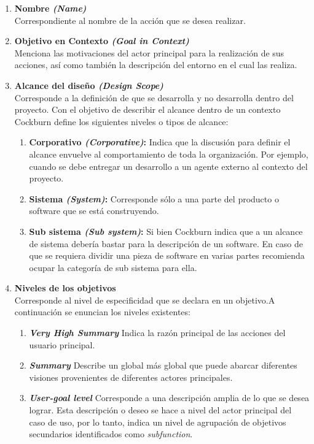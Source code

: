 \begin{enumerate}
  \item \textbf{Nombre \textit{(Name)}}\mbox{}\\ Correspondiente al nombre de la acción que se desea realizar.
  \item \textbf{Objetivo en Contexto \textit{(Goal in Context)}}\mbox{}\\ Menciona las motivaciones del actor principal para la realización de sus acciones, así como también la descripción del entorno en el cual las realiza.
  \item \textbf{Alcance del diseño \textit{(Design Scope)}} \mbox{} \\ Corresponde a la definición de que se desarrolla y no desarrolla dentro del proyecto. Con el objetivo de describir el alcance dentro de un contexto Cockburn define los siguientes niveles o tipos de alcance:
    \begin{enumerate}
      \item \textbf{Corporativo \textit{(Corporative)}:} Indica que la discusión para definir el alcance envuelve al comportamiento de toda la organización. Por ejemplo, cuando se debe entregar un desarrollo a un agente externo al contexto del proyecto.
      \item \textbf{Sistema \textit{(System)}:} Corresponde sólo a una parte del producto o software que se está construyendo.
      \item \textbf{Sub sistema \textit{(Sub system)}:} Si bien Cockburn indica que a un alcance de sistema debería bastar para la descripción de un software. En caso de que se requiera dividir una pieza de software en varias partes recomienda ocupar la categoría de sub sistema para ella.
    \end{enumerate}
  \item \textbf{Niveles de los objetivos} \mbox{} \\ Corresponde al nivel de especificidad que se declara en un objetivo.A continuación se enuncian los niveles existentes:
    \begin{enumerate}
      \item \textbf{\textit{Very High Summary}} Indica la razón principal de las acciones del usuario principal.
      \item \textbf{\textit{Summary}} Describe un global más global que puede abarcar diferentes visiones provenientes de diferentes actores principales.
      \item \textbf{\textit{User-goal level}} Corresponde a una descripción amplia de lo que se desea lograr. Esta descripción o deseo se hace a nivel del actor principal del caso de uso, por lo tanto, indica un nivel de agrupación de objetivos secundarios identificados como \textit{subfunction}.

\end{enumerate}
\end{enumerate}
